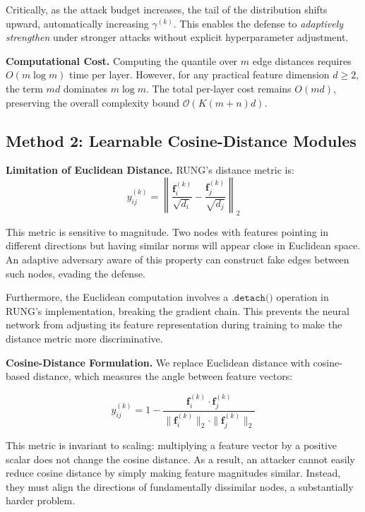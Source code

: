 \documentclass[sigconf]{acmart}
\begin{document}
Critically, as the attack budget increases, the tail of the distribution shifts upward, automatically increasing $\gamma^{(k)}$. This enables the defense to \emph{adaptively strengthen} under stronger attacks without explicit hyperparameter adjustment.

\textbf{Computational Cost.} Computing the quantile over $m$ edge distances requires $O(m \log m)$ time per layer. However, for any practical feature dimension $d \geq 2$, the term $md$ dominates $m \log m$. The total per-layer cost remains $O(md)$, preserving the overall complexity bound $\mathcal{O}(K(m+n)d)$.

\subsection{Method 2: Learnable Cosine-Distance Modules}\label{sec:method2}

\textbf{Limitation of Euclidean Distance.} RUNG's distance metric is:
$$y^{(k)}_{ij} = \left\lVert \frac{\mathbf{f}^{(k)}_i}{\sqrt{d_i}} - \frac{\mathbf{f}^{(k)}_j}{\sqrt{d_j}} \right\rVert_2$$

This metric is sensitive to magnitude. Two nodes with features pointing in different directions but having similar norms will appear close in Euclidean space. An adaptive adversary aware of this property can construct fake edges between such nodes, evading the defense.

Furthermore, the Euclidean computation involves a $\texttt{.detach()}$ operation in RUNG's implementation, breaking the gradient chain. This prevents the neural network from adjusting its feature representation during training to make the distance metric more discriminative.

\textbf{Cosine-Distance Formulation.} We replace Euclidean distance with cosine-based distance, which measures the angle between feature vectors:

\begin{equation}
y^{(k)}_{ij} = 1 - \frac{\mathbf{f}^{(k)}_i \cdot \mathbf{f}^{(k)}_j}{\|\mathbf{f}^{(k)}_i\|_2 \cdot \|\mathbf{f}^{(k)}_j\|_2}
\label{eq:cosine_dist}
\end{equation}

This metric is invariant to scaling: multiplying a feature vector by a positive scalar does not change the cosine distance. As a result, an attacker cannot easily reduce cosine distance by simply making feature magnitudes similar. Instead, they must align the directions of fundamentally dissimilar nodes, a substantially harder problem.
\end{document}
